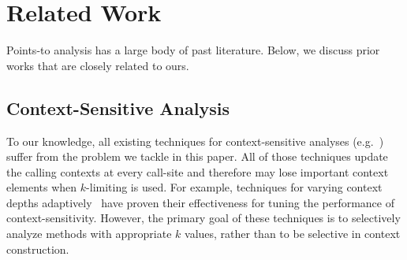 \section{Related Work}\label{sec:related}

Points-to analysis has a large body of past
literature\cite{Lhotak2006,Smaragdakis2015,hind2001pointer,Lhotak2008,Might2010,
 liang1999efficient,wilson1995efficient, liang2005evaluating, chatterjee1999relevant, Whaley2004, Shivers1988,Sharir1981, Milanova2005,Milanova2002, Smaragdakis2011, kastrinis2013hybrid}. Below, we discuss prior works that are closely related to
ours.


\subsection{Context-Sensitive Analysis} To our knowledge, all
existing techniques for context-sensitive analyses
(e.g.~\cite{Sharir1981,Milanova2002,Shivers1988,
  Whaley2004,Milanova2005,Smaragdakis2011, Khedker2008,
  Karkare2007,kastrinis2013hybrid,WeiR15,Smaragdakis2014,JeJeChOh17,Oh2014,TanLX16})
suffer from the problem we tackle in this paper. All of those
techniques update the calling contexts at every call-site and
therefore may lose important context elements when $k$-limiting is used.  For example,
techniques for varying context depths
adaptively~\cite{WeiR15,JeJeChOh17,Oh2014, Smaragdakis2014} have proven
their effectiveness for tuning the performance of context-sensitivity.  However,
the primary goal of these techniques is to selectively analyze methods
with appropriate $k$ values, rather than to be selective in context
construction.


